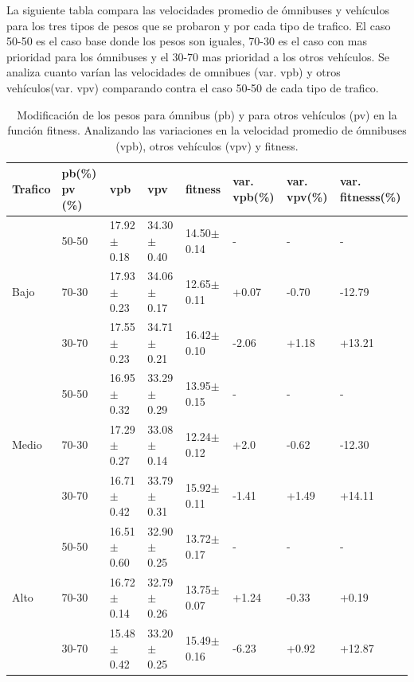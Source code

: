 La siguiente tabla compara las velocidades promedio de ómnibuses y vehículos para los tres tipos de pesos que se probaron y por cada tipo de trafico.  El caso 50-50 es el caso base donde los pesos son iguales, 70-30 es el caso con mas prioridad para los ómnibuses y el 30-70 mas prioridad a los otros vehículos. Se analiza cuanto varían las velocidades de omnibues (var. vpb) y otros vehículos(var. vpv) comparando contra el caso 50-50 de cada tipo de trafico.


\begin{table}[H]
	\renewcommand{\arraystretch}{1.2}
	\caption{Modificación de los pesos para ómnibus (pb) y para otros vehículos (pv) en la función fitness. Analizando las variaciones en la velocidad promedio de ómnibuses (vpb),  otros vehículos (vpv) y fitness. }
	\label{table:analisis_fitness}
	\centering
	\begin{tabular}{p{1cm}p{1.2cm}p{1.8cm}p{1.8cm}p{1.8cm}p{1.2cm}p{1.2cm}p{1.2cm} }
		\hline
		Trafico &
		pb(\%) pv (\%)& 
		vpb & 
		vpv &
		fitness &
		var. \newline vpb(\%) &
		var. \newline vpv(\%) &
		var. \newline fitnesss(\%)
		\\ 
		\hline
		& 50-50  & 17.92$\pm$0.18 & 34.30$\pm$0.40 & 14.50$\pm$0.14  &- & - & -\\		
		Bajo & 70-30  & 17.93$\pm$0.23 & 34.06$\pm$0.17 & 12.65$\pm$0.11  & +0.07 & -0.70 & -12.79\\		
		& 30-70 & 17.55$\pm$0.23 & 34.71$\pm$0.21 & 16.42$\pm$0.10  & -2.06 & +1.18 & +13.21\\
		\hline
		
		& 50-50  & 16.95$\pm$0.32 & 33.29$\pm$0.29 & 13.95$\pm$0.15  &- & - & -\\		
		Medio & 70-30  & 17.29$\pm$0.27 & 33.08$\pm$0.14 & 12.24$\pm$0.12  & +2.0 & -0.62 & -12.30\\		
		& 30-70 & 16.71$\pm$0.42 & 33.79$\pm$0.31 & 15.92$\pm$0.11  & -1.41 & +1.49& +14.11\\
		
		\hline
		& 50-50  & 16.51$\pm$0.60 & 32.90$\pm$0.25 & 13.72$\pm$0.17  &- & - & -\\		
		Alto & 70-30  & 16.72$\pm$0.14 & 32.79$\pm$0.26 & 13.75$\pm$0.07  & +1.24 & -0.33 & +0.19\\	
		& 30-70 & 15.48$\pm$0.42 & 33.20$\pm$0.25 & 15.49$\pm$0.16  & -6.23 & +0.92 & +12.87\\
		\hline
			
				

		

	\end{tabular}
\end{table}


